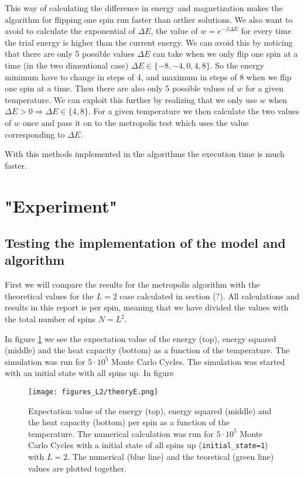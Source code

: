 \documentclass[11pt,a4wide]{article}
\begin{document}
This way of calculating the difference in energy and magnetization makes the algorithm for flipping one spin run faster than orther solutions. We also want to avoid to calculate the exponential of $\Delta E $, the value of $w=e^{-\beta\Delta E}$ for every time the trial energy is higher than the current energy. We can avoid this by noticing that there are only 5 possible values $\Delta E$ can take when we only flip one spin at a time (in the two dimentional case) $\Delta E \in \{-8, -4, 0, 4, 8\}$. So the energy minimum have to change in steps of 4, and maximum in steps of 8 when we flip one spin at a time. Then there are also only 5 possible values of $w$ for a given temperature. We can exploit this further by realizing that we only use $w$ when $\Delta E > 0 \Rightarrow \Delta E \in \{4, 8\}$. For a given temperature we then calculate the two values of $w$ once and pass it on to the metropolis test which uses the value corresponding to $\Delta E$. 

With this methods implemented in the algorithms the execution time is much faster. 

\section{"Experiment"}
\subsection{Testing the implementation of the model and algorithm}
First we will compare the results for the metropolis algorithm with the theoretical values for the $L=2$ case calculated in section (?). All calculations and results in this report is per spin, meaning that we have divided the values with the total number of spins $N=L^2$. 

In figure \ref{fig:theory E} we see the expectation value of the energy (top), energy squared (middle) and the heat capacity (bottom) as a function of the temperature. The simulation was run for $5\cdot10^5$ Monte Carlo Cycles. The simulation was started with an initial state with all spins up. In figure 

\begin{figure}[htp]
\centering
\texttt{[image: figures\_L2/theoryE.png]}
\caption{Expectation value of the energy (top), energy squared (middle) and the heat capacity (bottom) per spin as a function of the temperature. The numerical calculation was run for $5\cdot10^5$ Monte Carlo Cycles with a initial state of all spins up (\texttt{initial\_state=1}) with $L=2$. The numerical (blue line) and the teoretical (green line) values are plotted together.}
\label{fig:theory E}
\end{figure}
\end{document}
